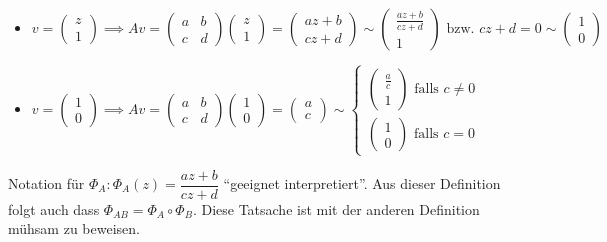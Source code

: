 \documentclass[../main.tex]{subfiles}
\begin{document}
\begin{definition}
    \begin{itemize}
        \item $v = \begin{pmatrix}
            z \\ 1
        \end{pmatrix} \implies Av = \begin{pmatrix}a&b\\c&d\end{pmatrix}\begin{pmatrix}z \\ 1\end{pmatrix}=\begin{pmatrix}az+b\\cz+d\end{pmatrix}
        \sim \begin{pmatrix}\frac{az+b}{cz+d} \\ 1\end{pmatrix}\text{ bzw. } cz+d=0 \sim \begin{pmatrix}1\\0\end{pmatrix}$\nolinebreak

        \item $v = \begin{pmatrix}1 \\ 0 \end{pmatrix} \implies Av = \begin{pmatrix}a&b\\c&d\end{pmatrix}\begin{pmatrix}1 \\ 0\end{pmatrix}=\begin{pmatrix}a \\ c \end{pmatrix}
        \sim \begin{cases}
            \begin{pmatrix}\frac{a}{c}\\1 \end{pmatrix}\text{ falls } c \not = 0 \\
            \begin{pmatrix}1\\0 \end{pmatrix} \text{ falls } c = 0
                
        \end{cases}$
    \end{itemize}

    Notation für $\Phi _A : \Phi _A(z)= \dfrac{az+b}{cz+d}$
    ``geeignet interpretiert''.
    Aus dieser Definition folgt auch dass $\Phi _{AB} = \Phi _A \circ \Phi _B$. Diese Tatsache ist mit der anderen Definition
    mühsam zu beweisen.
    






\end{definition}
\end{document}
